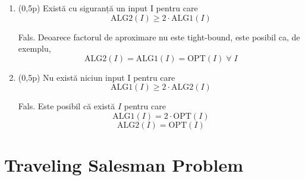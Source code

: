 \documentclass[a4paper,12pt]{article}
\newcommand*{\OPT}{\text{OPT}}
\newcommand*{\ALG}{\text{ALG}}
\begin{document}
\begin{enumerate}
\begin{enumerate}

\item (0,5p)
Există cu siguranță un input I pentru care
\[\ALG2(I) \geq 2 \cdot \ALG1(I)\]

Fals. Deoarece factorul de aproximare nu este tight-bound, este posibil ca, de exemplu,
\[\ALG2(I) = \ALG1(I) = \OPT(I) \;\forall\; I\]

\item (0,5p)
Nu există niciun input I pentru care
\[\ALG1(I) \geq 2 \cdot \ALG2(I)\]

Fals. Este posibil că există $I$ pentru care
\[\ALG1(I) = 2 \cdot \OPT(I)\]
\[\ALG2(I) = \OPT(I)\]

\end{enumerate}

\end{enumerate}

\section{Traveling Salesman Problem}
\end{document}
